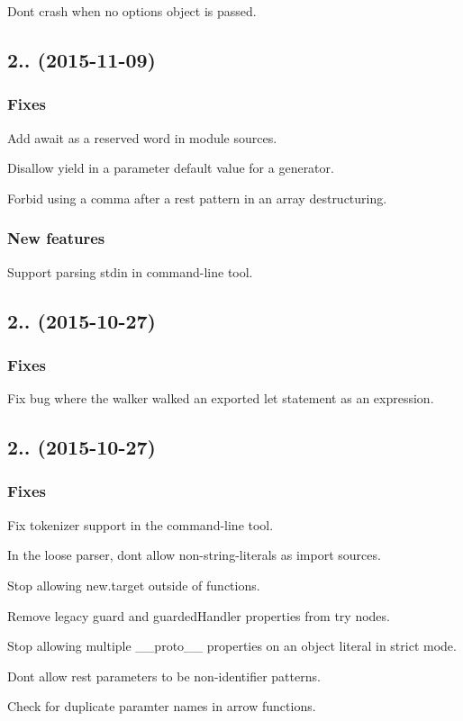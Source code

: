 Don\textquotesingle{}t crash when no options object is passed.

\subsection*{2.. (2015-\/11-\/09)}

\subsubsection*{Fixes}

Add {\ttfamily await} as a reserved word in module sources.

Disallow {\ttfamily yield} in a parameter default value for a generator.

Forbid using a comma after a rest pattern in an array destructuring.

\subsubsection*{New features}

Support parsing stdin in command-\/line tool.

\subsection*{2.. (2015-\/10-\/27)}

\subsubsection*{Fixes}

Fix bug where the walker walked an exported {\ttfamily let} statement as an expression.

\subsection*{2.. (2015-\/10-\/27)}

\subsubsection*{Fixes}

Fix tokenizer support in the command-\/line tool.

In the loose parser, don\textquotesingle{}t allow non-\/string-\/literals as import sources.

Stop allowing {\ttfamily new.\+target} outside of functions.

Remove legacy {\ttfamily guard} and {\ttfamily guarded\+Handler} properties from try nodes.

Stop allowing multiple {\ttfamily \+\_\+\+\_\+proto\+\_\+\+\_\+} properties on an object literal in strict mode.

Don\textquotesingle{}t allow rest parameters to be non-\/identifier patterns.

Check for duplicate paramter names in arrow functions. 